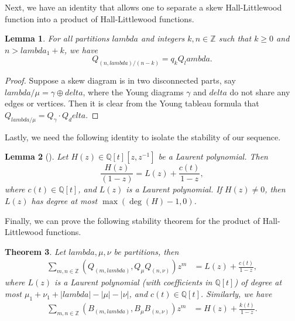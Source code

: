 \documentclass[12pt]{amsart}%
\def\lambda{lambda}%
\def\delta{delta}%
\newtheorem{theorem}{Theorem}[section]
\newtheorem{lemma}[theorem]{Lemma}
\theoremstyle{remark}
\theoremstyle{definition}
\newcommand{\Z}{\mathbb{Z}}
\newcommand{\Q}{\mathbb{Q}}
\begin{document}
    Next, we have an identity that allows one to separate a skew Hall-Littlewood function into a product of Hall-Littlewood functions.
    
    \begin{lemma}
        For all partitions $\lambda$ and integers $k,n\in\Z$ such that $k\geq0$ and $n>\lambda_1+k$, we have
        \[Q_{(n,\lambda)/(n-k)}=q_kQ_\lambda.\]
    \end{lemma}

    \begin{proof}
        Suppose a skew diagram is in two disconnected parts, say $\lambda/\mu=\gamma\oplus\delta$, where the Young diagrams $\gamma$ and $\delta$ do not share any edges or vertices. Then it is clear from the Young tableau formula \cite[p.~229]{macdonald:1995} that $Q_{\lambda/\mu}=Q_\gamma\cdot Q_\delta$.
    \end{proof}

    Lastly, we need the following identity to isolate the stability of our sequence.

    \begin{lemma}[\cite{graf-jing:2024b}]\label{lem: separate}
        Let $H(z)\in\Q[t][z,z^{-1}]$ be a Laurent polynomial. Then
        \begin{equation*}
            \frac{H(z)}{(1-z)}=L(z)+\frac{c(t)}{1-z},
        \end{equation*}
        where $c(t)\in\Q[t]$, and $L(z)$ is a Laurent polynomial. If $H(z)\neq0$, then $L(z)$ has degree at most $\max(\deg(H)-1,0)$.
    \end{lemma}

    Finally, we can prove the following stability theorem for the product of Hall-Littlewood functions.

    \begin{theorem}\label{thm: skew stability}
        Let $\lambda,\mu,\nu$ be partitions, then
        \begin{align*}
            \sum_{m,n\in\Z}\left(Q_{(m,\lambda)},Q_\mu Q_{(n,\nu)}\right)z^m&=L(z)+\frac{c(t)}{1-z},
        \end{align*}
        where $L(z)$ is a Laurent polynomial (with coefficients in $\Q[t]$) of degree at most $\mu_1+\nu_1+|\lambda|-|\mu|-|\nu|$, and $c(t)\in\Q[t]$. Similarly, we have
        \begin{align*}
            \sum_{m,n\in\Z}\left(B_{(m,\lambda)},B_\mu B_{(n,\nu)}\right)z^m&=H(z)+\frac{k(t)}{1-z}.
        \end{align*}
    \end{theorem}
\end{document}
